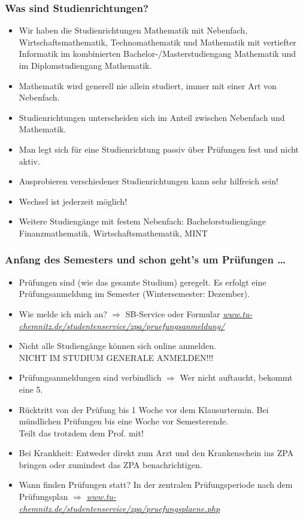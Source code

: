 \documentclass[10pt]{beamer}
\makeatletter
\newcommand{\highl}[1]{\color{tuccolor@ma}#1\color{black}}
\makeatother
\begin{document}
\begin{frame}
\frametitle{Was sind Studienrichtungen?}
\begin{itemize}
	\item Wir haben die Studienrichtungen Mathematik mit Nebenfach, Wirtschaftsmathematik, Technomathematik und Mathematik mit vertiefter Informatik im kombinierten Bachelor-/Masterstudiengang Mathematik und im Diplomstudiengang Mathematik.
	\item Mathematik wird generell nie allein studiert, immer mit einer Art von Nebenfach.
	\item Studienrichtungen unterscheiden sich im Anteil zwischen Nebenfach und Mathematik.
	\item Man legt sich für eine Studienrichtung passiv über Prüfungen fest und nicht aktiv.
	\item Ausprobieren verschiedener Studienrichtungen kann sehr hilfreich sein!
	\item Wechsel ist jederzeit möglich!
	\item Weitere Studiengänge mit festem Nebenfach: Bachelorstudiengänge Finanzmathematik, Wirtschaftsmathematik, MINT
\end{itemize}
\end{frame}

\begin{frame}
\frametitle{Anfang des Semesters und schon geht's um Prüfungen \dots}
\begin{itemize}
	\item Prüfungen sind (wie das gesamte Studium) geregelt. Es erfolgt eine Prüfungsanmeldung im Semester (Wintersemester: Dezember).
	\item Wie melde ich mich an? $\Rightarrow$ SB-Service oder Formular \textit{\href{https://www.tu-chemnitz.de/studentenservice/zpa/pruefungsanmeldung/index.php}{www.tu-chemnitz.de/studentenservice/zpa/pruefungsanmeldung/}}
	\item Nicht alle Studiengänge können sich online anmelden.\\
	 \highl{NICHT IM STUDIUM GENERALE ANMELDEN!!!}
	\item Prüfungsanmeldungen sind verbindlich $\Rightarrow$ Wer nicht auftaucht, bekommt eine 5. 
	\item Rücktritt von der Prüfung bis 1 Woche vor dem Klausurtermin. Bei mündlichen Prüfungen bis eine Woche vor Semesterende.\\
	\highl{Teilt das trotzdem dem Prof. mit!}
	\item Bei Krankheit: Entweder direkt zum Arzt und den Krankenschein ins ZPA bringen oder zumindest das ZPA benachrichtigen.
	\item Wann finden Prüfungen statt? In der zentralen Prüfungsperiode nach dem Prüfungsplan $\Rightarrow$ \textit{\href{https://www.tu-chemnitz.de/studentenservice/zpa/pruefungsplaene.php}{www.tu-chemnitz.de/studentenservice/zpa/pruefungsplaene.php}}
\end{itemize}
\end{frame}
\end{document}
